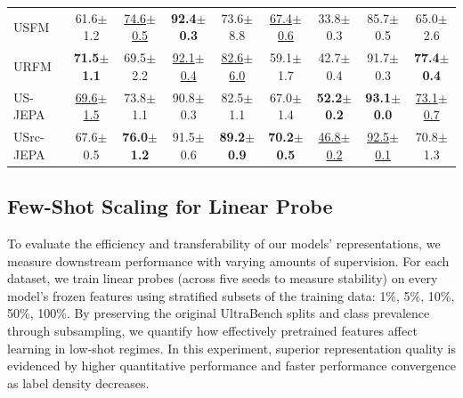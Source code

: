 \documentclass{article}
\theoremstyle{plain}
\theoremstyle{definition}
\theoremstyle{remark}
\begin{document}
\begin{table}[t]
\begin{center}
\begin{small}
\begin{sc}
\begin{tabular}{lcccccccc}
          USFM         & 61.6$\pm$1.2 & \underline{74.6$\pm$0.5} & \textbf{92.4$\pm$0.3} & 73.6$\pm$8.8 & \underline{67.4$\pm$0.6} & 33.8$\pm$0.3 & 85.7$\pm$0.5 & 65.0$\pm$2.6 \\
          URFM         & \textbf{71.5$\pm$1.1} & 69.5$\pm$2.2 & \underline{92.1$\pm$0.4} & \underline{82.6$\pm$6.0} & 59.1$\pm$1.7 & 42.7$\pm$0.4 & 91.7$\pm$0.3 & \textbf{77.4$\pm$0.4} \\
          \midrule
          US-JEPA & \underline{69.6$\pm$1.5} & 73.8$\pm$1.1 & 90.8$\pm$0.3 & 82.5$\pm$1.1 & 67.0$\pm$1.4 & \textbf{52.2$\pm$0.2} & \textbf{93.1$\pm$0.0} & \underline{73.1$\pm$0.7} \\
          USrc-JEPA & 67.6$\pm$0.5 & \textbf{76.0$\pm$1.2} & 91.5$\pm$0.6 & \textbf{89.2$\pm$0.9} & \textbf{70.2$\pm$0.5} & \underline{46.8$\pm$0.2} & \underline{92.5$\pm$0.1} & 70.8$\pm$1.3 \\
          \bottomrule
        \end{tabular}
      \end{sc}
    \end{small}
  \end{center}
  \vskip -0.1in
\end{table}

\subsection{Few-Shot Scaling for Linear Probe} \label{txt:fewshot}

To evaluate the efficiency and transferability of our models' representations, we measure downstream performance with varying amounts of supervision. For each dataset, we train linear probes (across five seeds to measure stability) on every model's frozen features using stratified subsets of the training data: {1\%, 5\%, 10\%, 50\%, 100\%}. By preserving the original UltraBench splits and class prevalence through subsampling, we quantify how effectively pretrained features affect learning in low-shot regimes. In this experiment, superior representation quality is evidenced by higher quantitative performance and faster performance convergence as label density decreases.
\end{document}
